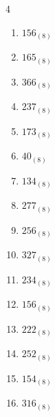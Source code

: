 \begin{multicols}{4}
\begin{enumerate}
  \item $156_{(8)}$

        \phantom{$=110$}

  \item $165_{(8)}$

        \phantom{$=117$}

  \item $366_{(8)}$

        \phantom{$=246$}

  \item $237_{(8)}$

        \phantom{$=159$}

  \item $173_{(8)}$

        \phantom{$=123$}

  \item $40_{(8)}$

        \phantom{$=32$}

  \item $134_{(8)}$

        \phantom{$=92$}

  \item $277_{(8)}$

        \phantom{$=191$}

  \item $256_{(8)}$

        \phantom{$=174$}

  \item $327_{(8)}$

        \phantom{$=215$}

  \item $234_{(8)}$

        \phantom{$=156$}

  \item $156_{(8)}$

        \phantom{$=110$}

\columnbreak %

  \item $222_{(8)}$

        \phantom{$=146$}

  \item $252_{(8)}$

        \phantom{$=170$}

  \item $154_{(8)}$

        \phantom{$=108$}

  \item $316_{(8)}$


\end{enumerate}
\end{multicols}
